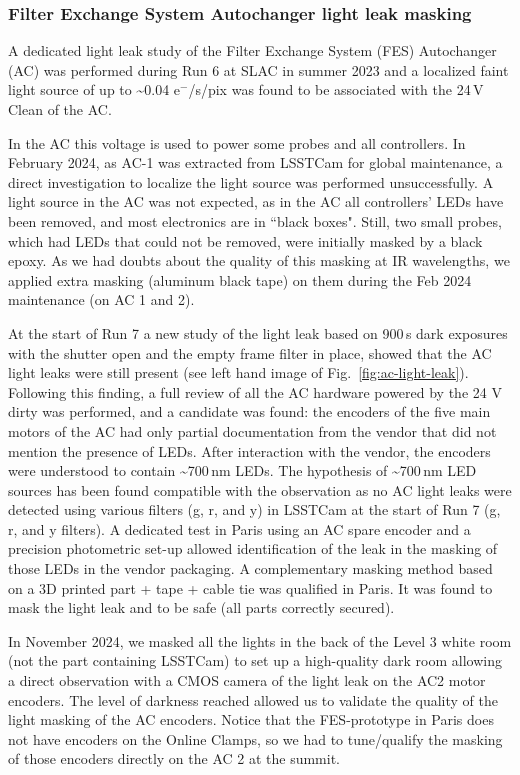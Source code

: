 \subsubsection{Filter Exchange System Autochanger light leak
masking}\label{successful-autochanger-light-leaks-masking}

A dedicated light leak study of the Filter Exchange System (FES) Autochanger (AC) was performed during Run 6 at SLAC
in summer 2023 and a localized faint light source of up to
\textasciitilde{}0.04 e$^-$/s/pix was found to be associated with the 24\,V Clean of
the AC.

In the AC this voltage is used to power some probes and all
controllers. In February 2024, as AC-1 was extracted from LSSTCam for
global maintenance, a direct investigation to localize the light
source was performed unsuccessfully. A light source in the AC
was not expected, as in the AC all controllers' LEDs have
been removed, and most electronics are in ``black boxes". Still, two small
probes, which had LEDs that could not be removed, were initially masked
by a black epoxy. As we had doubts about the quality of this masking at
IR wavelengths, we applied extra masking (aluminum black tape) on them during
the Feb 2024 maintenance (on AC 1 and 2).

At the start of Run 7 a new study of the light leak based on 900\,s
dark exposures with the shutter open and the empty frame filter in
place, showed that the AC light leaks were still present (see left hand image of Fig.~\ref{fig:ac-light-leak}). Following this finding, a full review of all the AC hardware powered
by the 24 V dirty was performed, and a candidate was found: the encoders
of the five main motors of the AC had only partial documentation from the
vendor that did not mention the presence of LEDs. After interaction with the
vendor, the encoders were understood to contain \textasciitilde700\,nm LEDs. The hypothesis of \textasciitilde700\,nm LED sources has been
found compatible with the observation as no AC light leaks were detected
using various filters (g, r, and y) in LSSTCam at the start of Run 7 (g, r, and y
filters). A dedicated test in Paris using an AC spare encoder and a
precision photometric set-up allowed identification of the leak in the masking of
those LEDs in the vendor packaging. A complementary masking method based
on a 3D printed part + tape + cable tie was qualified in Paris.  It was
found to mask the light leak and to be safe (all parts correctly secured).

In November 2024, we masked all the lights in the back of the Level 3 white
room (not the part containing LSSTCam) to set up a high-quality dark room
allowing a direct observation with a CMOS camera of the light leak on
the AC2 motor encoders. The level of darkness reached allowed us to
validate the quality of the light masking of the AC encoders. Notice that the
FES-prototype in Paris does not have encoders on the Online
Clamps, so we had to tune/qualify the masking of those encoders directly on the AC 2 at the summit.

